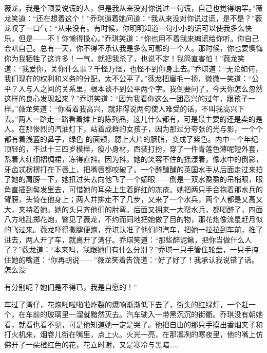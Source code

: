 \documentclass{article}
\begin{document}
薇龙，我是个顶爱说谎的人，但是我从来没对你说过一句谎，自己也觉得纳罕。”薇龙笑道：“还在想着这个！”乔琪逼着她问道：“我从来没对你说过谎，是不是？”薇龙叹了一口气：“从来没有。有时候，你明明知道一句小小的谎可以使我多么快乐，但是——不！你懒得操心。”乔琪笑道：“你也用不着我来编谎给你听。你自己会哄自己。总有一天，你不得不承认我是多么可鄙的一个人。那时候，你也要懊悔你为我牺牲了这许多！一气，就把我杀了，也说不定！我简直害怕！”薇龙笑道：“我爱你，关你什么事？千怪万怪，也怪不到你身上去。”乔琪道：“无论如何，我们现在的权利和义务的分配，太不公平了。”薇龙把眉毛一扬，微微一笑道：“公平？人与人之间的关系里，根本谈不到公平两个字。我倒要问了，今天你怎么忽然这样的良心发现起来？”乔琪笑道：“因为我看你这么一团高兴的过年，跟孩子一样。”薇龙笑道：“你看着我高兴，就非得说两句使人难受的话，不叫我高兴下去。”两人一路走一路看着摊上的陈列品，这儿什么都有，可是最主要的还是卖的是人。在那惨烈的汽油灯下，站着成群的女孩子，因为那过分夸张的光与影，一个个都有着浅蓝的鼻子，绿色
\newpage
的面颊，腮上大片的胭脂，变成了紫色。内中一个年纪顶轻的，不过十三四岁模样，瘦小身材，西装打扮，穿了一件青莲色薄呢短外套，系着大红细褶绸裙，冻得直抖。因为抖，她的笑容不住的摇漾着，像水中的倒影，牙齿忒楞楞打在下唇上，把嘴唇都咬破了。一个醉醺醺的英国水手从后面走过来拍了她的肩膀一下，她扭过头去向他飞了一个媚眼——倒是一双水盈盈的吊梢眼，眼角直插到鬓发里去，可惜她的耳朵上生着鲜红的冻疮。她把两只手合抱着那水兵的臂膀，头倚在他身上；两人并排走不了几步，又来了一个水兵，两个人都是又高又大，夹持着她。她的头只齐他们的肘弯。后面又拥来一大帮水兵，都喝醉了，四面八方地乱掷花炮，瞥见了薇龙，不约而同地把她做了目的物，那花炮像流星赶月似的飞过来。薇龙吓得撒腿便跑，乔琪认准了他们的汽车，把她一拉拉到车前，推了进去，两人开了车，就离开了湾仔。乔琪笑道：“那些醉泥鳅，把你当做什么人了？”薇龙道：“本来吗，我跟她们有什么分别？”乔琪一只手管住轮盘，一只手掩住她的嘴道：“你再胡说——”薇龙笑着告饶道：“好了好了！我承认我说错了话。怎么没

\newpage
有分别呢？她们是不得已，我是自愿的！” 

车过了湾仔，花炮啪啦啪啦炸裂的爆响渐渐低下去了，街头的红绿灯，一个赶一个，在车前的玻璃里一溜就黯然灭去。汽车驶入一带黑沉沉的街衢。乔琪没有朝她看，就看也看不见，可是他知道她一定是哭了。他把自由的那只手摸出香烟夹子和打火机来，烟卷儿衔在嘴里，点上火。火光一亮，在那凛冽的寒夜里，他的嘴上仿佛开了一朵橙红色的花，花立时谢，又是寒冷与黑暗……
\end{document}
